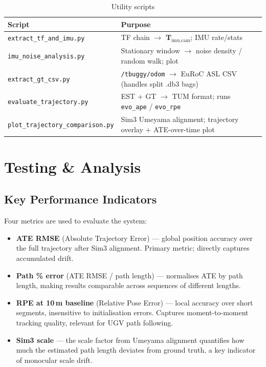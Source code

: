 \documentclass[10pt,a4paper]{article}
\begin{document}
\begin{table}[H]
\centering\small
\caption{Utility scripts}
\begin{tabular}{ll}
\toprule
Script & Purpose \\
\midrule
\texttt{extract\_tf\_and\_imu.py} & TF chain $\rightarrow$ $\mathbf{T}_{\text{imu,cam}}$; IMU rate/stats \\
\texttt{imu\_noise\_analysis.py} & Stationary window $\rightarrow$ noise density / random walk; plot \\
\texttt{extract\_gt\_csv.py} & \texttt{/tbuggy/odom} $\rightarrow$ EuRoC ASL CSV (handles split .db3 bags) \\
\texttt{evaluate\_trajectory.py} & EST + GT $\rightarrow$ TUM format; runs \texttt{evo\_ape} / \texttt{evo\_rpe} \\
\texttt{plot\_trajectory\_comparison.py} & Sim3 Umeyama alignment; trajectory overlay + ATE-over-time plot \\
\bottomrule
\end{tabular}
\end{table}

\section{Testing \& Analysis}

\subsection{Key Performance Indicators}

Four metrics are used to evaluate the system:

\begin{itemize}[nosep]
  \item \textbf{ATE RMSE} (Absolute Trajectory Error) --- global position accuracy over the
    full trajectory after Sim3 alignment. Primary metric; directly captures accumulated drift.
  \item \textbf{Path \% error} (ATE RMSE / path length) --- normalises ATE by path length,
    making results comparable across sequences of different lengths.
  \item \textbf{RPE at 10\,m baseline} (Relative Pose Error) --- local accuracy over short
    segments, insensitive to initialisation errors. Captures moment-to-moment tracking quality,
    relevant for UGV path following.
  \item \textbf{Sim3 scale} --- the scale factor from Umeyama alignment quantifies how much
    the estimated path length deviates from ground truth, a key indicator of monocular scale
    drift.
\end{itemize}
\end{document}
